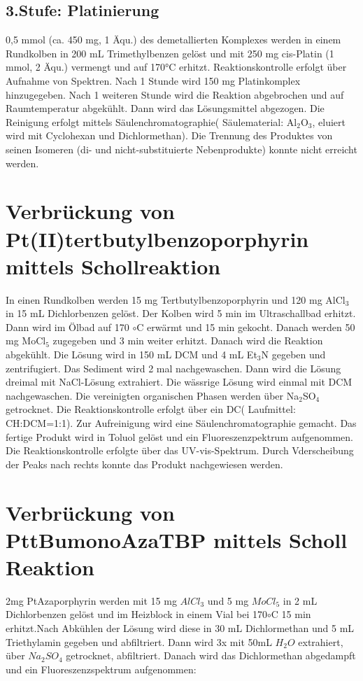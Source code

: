 \subsection{3.Stufe: Platinierung}
0,5 mmol (ca. 450 mg, 1 Äqu.) des demetallierten Komplexes werden in einem Rundkolben in 200 mL Trimethylbenzen gelöst und mit 250 mg cis-Platin (1 mmol, 2 Äqu.) vermengt und auf 170°C erhitzt. Reaktionskontrolle erfolgt über Aufnahme von Spektren. Nach 1 Stunde wird 150 mg Platinkomplex hinzugegeben. Nach 1 weiteren Stunde wird die Reaktion abgebrochen und auf Raumtemperatur abgekühlt. Dann wird das Lösungsmittel abgezogen. Die Reinigung erfolgt mittels Säulenchromatographie( Säulematerial: Al$_2$O$_3$, eluiert wird mit Cyclohexan und Dichlormethan). Die Trennung des Produktes von seinen Isomeren (di- und nicht-substituierte Nebenprodukte) konnte nicht erreicht werden.

\section{Verbrückung von Pt(II)tertbutylbenzoporphyrin mittels Schollreaktion}
In einen Rundkolben werden 15 mg Tertbutylbenzoporphyrin und 120 mg AlCl$_3$ in 15 mL Dichlorbenzen gelöst. Der Kolben wird 5 min im Ultraschallbad erhitzt. Dann wird im Ölbad auf 170 $\circ$C erwärmt und 15 min gekocht. Danach werden 50 mg MoCl$_5$ zugegeben und 3 min weiter erhitzt. Danach wird die Reaktion abgekühlt. Die Lösung wird in 150 mL DCM und 4 mL Et$_3$N gegeben und zentrifugiert. Das Sediment wird 2 mal nachgewaschen. Dann wird die Lösung dreimal mit NaCl-Lösung extrahiert. Die wässrige Lösung wird einmal mit DCM nachgewaschen.  Die vereinigten organischen Phasen werden über Na$_2$SO$_4$ getrocknet. Die Reaktionskontrolle erfolgt über ein DC( Laufmittel: CH:DCM=1:1). Zur Aufreinigung wird eine Säulenchromatographie gemacht. Das fertige Produkt wird in Toluol gelöst und ein Fluoreszenzpektrum aufgenommen. Die Reaktionskontrolle erfolgte über das UV-vis-Spektrum. Durch Vderscheibung der Peaks nach rechts konnte das Produkt nachgewiesen werden.

\section{Verbrückung von PttBumonoAzaTBP mittels Scholl Reaktion}
2mg PtAzaporphyrin werden mit 15 mg $AlCl_3$ und 5 mg $MoCl_5$ in 2 mL Dichlorbenzen gelöst und im Heizblock in einem Vial bei 170$\circ$C 15 min erhitzt.Nach Abkühlen der Lösung wird diese in 30 mL Dichlormethan und 5 mL Triethylamin gegeben und abfiltriert. Dann wird 3x mit 50mL $H_2O$ extrahiert, über $Na_2SO_4$ getrocknet, abfiltriert. Danach wird das Dichlormethan abgedampft und ein Fluoreszenzspektrum aufgenommen:
